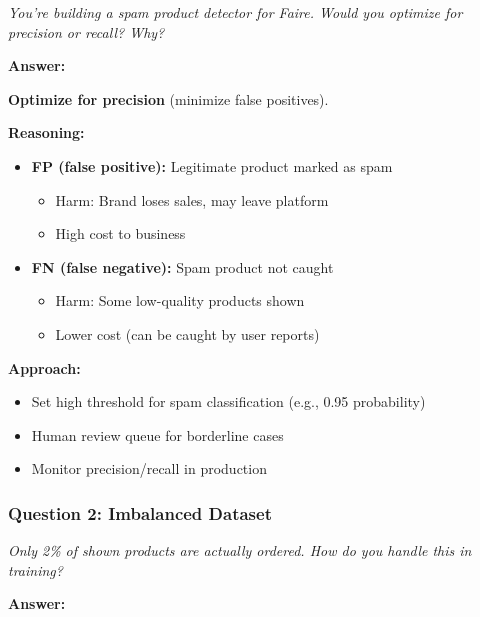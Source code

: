 \documentclass[11pt,letterpaper]{article}
\begin{document}
\textit{You're building a spam product detector for Faire. Would you optimize for precision or recall? Why?}

\textbf{Answer:}

\textbf{Optimize for precision} (minimize false positives).

\textbf{Reasoning:}
\begin{itemize}
    \item \textbf{FP (false positive):} Legitimate product marked as spam
    \begin{itemize}
        \item Harm: Brand loses sales, may leave platform
        \item High cost to business
    \end{itemize}
    \item \textbf{FN (false negative):} Spam product not caught
    \begin{itemize}
        \item Harm: Some low-quality products shown
        \item Lower cost (can be caught by user reports)
    \end{itemize}
\end{itemize}

\textbf{Approach:}
\begin{itemize}
    \item Set high threshold for spam classification (e.g., 0.95 probability)
    \item Human review queue for borderline cases
    \item Monitor precision/recall in production
\end{itemize}

\subsubsection{Question 2: Imbalanced Dataset}

\textit{Only 2\% of shown products are actually ordered. How do you handle this in training?}

\textbf{Answer:}
\end{document}
